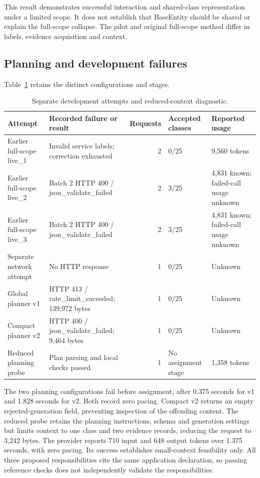 This result demonstrates successful interaction and shared-class representation under a limited scope. It does not establish that BaseEntity should be shared or explain the full-scope collapse. The pilot and original full-scope method differ in labels, evidence acquisition and context.

\subsection{Planning and development failures}

Table~\ref{tab:failures} retains the distinct configurations and stages.

\begin{table}[t]
\centering
\caption{Separate development attempts and reduced-context diagnostic.}
\label{tab:failures}
\begin{tabular}{@{}p{}p{}rp{}p{}@{}}
\hline
Attempt & Recorded failure or result & Requests & Accepted classes & Reported usage \\
\hline
Earlier full-scope live\_1 & Invalid service labels; correction exhausted & 2 & 0/25 & 9,560 tokens \\
Earlier full-scope live\_2 & Batch 2 HTTP 400 / json\_validate\_failed & 2 & 3/25 & 4,831 known; failed-call usage unknown \\
Earlier full-scope live\_3 & Batch 2 HTTP 400 / json\_validate\_failed & 2 & 3/25 & 4,831 known; failed-call usage unknown \\
Separate network attempt & No HTTP response & 1 & 0/25 & Unknown \\
Global planner v1 & HTTP 413 / rate\_limit\_exceeded; 139,972 bytes & 1 & 0/25 & Unknown \\
Compact planner v2 & HTTP 400 / json\_validate\_failed; 9,464 bytes & 1 & 0/25 & Unknown \\
Reduced planning probe & Plan parsing and local checks passed & 1 & No assignment stage & 1,358 tokens \\
\hline
\end{tabular}
\end{table}


The two planning configurations fail before assignment, after 0.375 seconds for v1 and 1.828 seconds for v2. Both record zero pacing. Compact v2 returns an empty rejected-generation field, preventing inspection of the offending content. The reduced probe retains the planning instructions, schema and generation settings but limits context to one class and two evidence records, reducing the request to 3,242 bytes. The provider reports 710 input and 648 output tokens over 1.375 seconds, with zero pacing. Its success establishes small-context feasibility only. All three proposed responsibilities cite the same application declaration, so passing reference checks does not independently validate the responsibilities.

